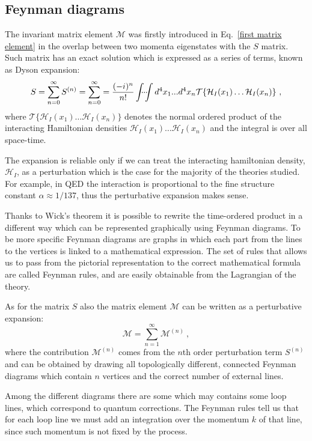 \documentclass[../main/main.tex]{subfiles}
\begin{document}
\subsection{Feynman diagrams}
The invariant matrix element $\mathcal{M}$ was firstly introduced in Eq.~\ref{first matrix element} in the overlap between two momenta
eigenstates with the $S$ matrix.
Such matrix has an exact solution which is expressed as a series of terms, known as Dyson expansion:
\begin{equation}
	\label{S}
	S = \sum_{n = 0}^{\infty} S^{(n)} = \sum_{n = 0}^{\infty} =  \frac{(-i)^n}{n!}\idotsint d^4 x_1 ... d^4 x_n \mathcal{T}\{ \mathcal{H}_I(x_1) \dots \mathcal{H}_I(x_n) \} \ ,
\end{equation}
where $\mathcal{T}\{ \mathcal{H}_I(x_1) \dots \mathcal{H}_I(x_n) \}$ denotes the normal ordered product of the interacting 
Hamiltonian densities $ \mathcal{H}_I(x_1) \dots \mathcal{H}_I(x_n)$ and the integral is over all space-time.

The expansion is reliable only if we can treat the interacting hamiltonian density, $\mathcal{H}_I$, as a perturbation which is the case for 
the majority of the theories studied. For example, in QED the interaction is proportional to the fine structure constant $\alpha \approx 1/137$, thus the perturbative expansion makes sense.

Thanks to Wick's theorem it is possible to rewrite the time-ordered product in a different way which can be represented graphically using Feynman diagrams. 
To be more specific Feynman diagrams are graphs in which each part from the lines to the vertices is linked to a mathematical expression.
The set of rules that allows us to pass from the pictorial representation to the correct mathematical formula are called Feynman rules, and
are easily obtainable from the Lagrangian of the theory.

As for the matrix $S$ also the matrix element $\mathcal{M}$ can be written as a perturbative expansion:
\begin{equation}
	\label{exp M}
	\mathcal{M}= \sum_{n = 1}^{\infty} \mathcal{M}^{(n)} \ ,
\end{equation} 
where the contribution $\mathcal{M}^{(n)} $ comes from the $n$th order perturbation term $S^{(n)}$ and can be obtained by drawing 
all topologically different, connected Feynman diagrams which contain $n$ vertices and the correct number of external lines.

Among the different diagrams there are some which may contains some loop lines, which correspond to quantum corrections.
 The Feynman rules tell us that for each loop line we must add an integration over the momentum $k$ of that line, since such momentum is not fixed by the process.
\end{document}
